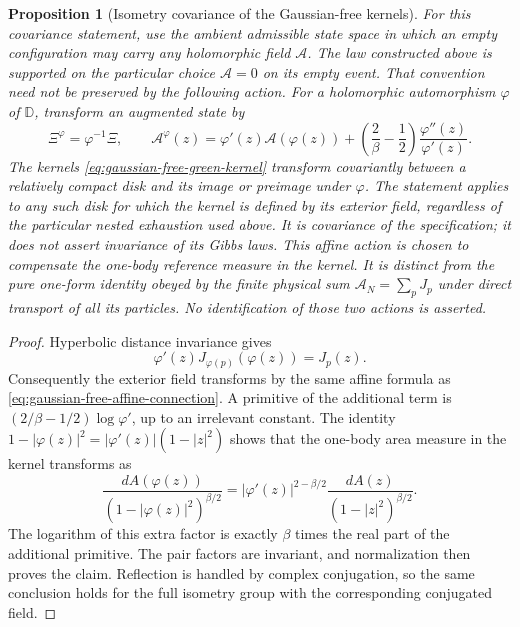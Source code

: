 \documentclass[11pt,a4paper]{article}
\numberwithin{equation}{section}
\newtheorem{proposition}[theorem]{Proposition}
\theoremstyle{definition}
\theoremstyle{remark}
\newcommand{\D}{\mathbb D}
\begin{document}
\begin{proposition}[Isometry covariance of the Gaussian-free kernels]
\label{prop:gaussian-free-green-covariance}
For this covariance statement, use the ambient admissible state space
in which an empty configuration may carry any holomorphic field
$\mathcal A$. The law constructed above is supported on the particular
choice $\mathcal A=0$ on its empty event. That convention need not be
preserved by the following action. For a holomorphic automorphism
$\varphi$ of $\D$, transform an augmented state by
\begin{equation}\label{eq:gaussian-free-affine-connection}
 \Xi^\varphi=\varphi^{-1}\Xi,\qquad
 \mathcal A^\varphi(z)
  =\varphi'(z)\mathcal A(\varphi(z))
       +\left(\frac2\beta-\frac12\right)
                              \frac{\varphi''(z)}{\varphi'(z)}.
\end{equation}
The kernels \eqref{eq:gaussian-free-green-kernel} transform covariantly
between a relatively compact disk and its image or preimage under
$\varphi$. The statement applies to any such disk for which the
kernel is defined by its exterior field, regardless of the particular
nested exhaustion used above. It is covariance of the specification;
it does not assert invariance of its Gibbs laws. This affine action is
chosen to compensate the one-body reference measure in the kernel. It
is distinct from the pure one-form identity obeyed by the finite
physical sum $\mathcal A_N=\sum_pJ_p$ under direct transport of all
its particles. No identification of those two actions is asserted.
\end{proposition}

\begin{proof}
Hyperbolic distance invariance gives
\[
 \varphi'(z)J_{\varphi(p)}(\varphi(z))=J_p(z).
\]
Consequently the exterior field transforms by the same affine formula
as \eqref{eq:gaussian-free-affine-connection}. A primitive of the
additional term is
$(2/\beta-1/2)\log\varphi'$, up to an irrelevant constant.
The identity
$1-|\varphi(z)|^2=|\varphi'(z)|(1-|z|^2)$ shows that the one-body
area measure in the kernel transforms as
\[
 \frac{dA(\varphi(z))}{(1-|\varphi(z)|^2)^{\beta/2}}
 =|\varphi'(z)|^{2-\beta/2}
                      \frac{dA(z)}{(1-|z|^2)^{\beta/2}}.
\]
The logarithm of this extra factor is exactly $\beta$ times the
real part of the additional primitive. The pair factors are invariant,
and normalization then proves the claim. Reflection is handled by
complex conjugation, so the same conclusion holds for the full
isometry group with the corresponding conjugated field.
\end{proof}
\end{document}
